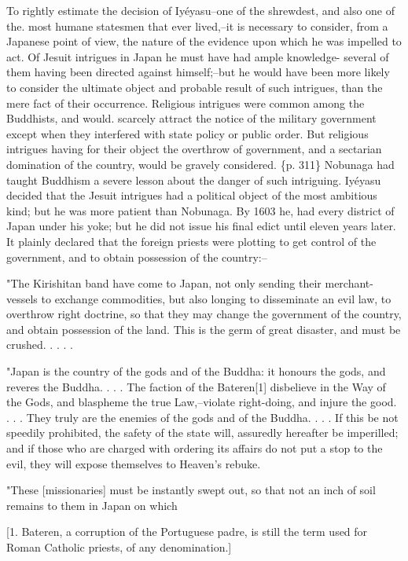 To rightly estimate the decision of Iyéyasu--one of the shrewdest, and also one of the. most humane statesmen that ever lived,--it is necessary to consider, from a Japanese point of view, the nature of the evidence upon which he was impelled to act. Of Jesuit intrigues in Japan he must have had ample knowledge- several of them having been directed against himself;--but he would have been more likely to consider the ultimate object and probable result of such intrigues, than the mere fact of their occurrence. Religious intrigues were common among the Buddhists, and would. scarcely attract the notice of the military government except when they interfered with state policy or public order. But religious intrigues having for their object the overthrow of government, and a sectarian domination of the country, would be gravely considered. \{p. 311\} Nobunaga had taught Buddhism a severe lesson about the danger of such intriguing. Iyéyasu decided that the Jesuit intrigues had a political object of the most ambitious kind; but he was more patient than Nobunaga. By 1603 he, had every district of Japan under his yoke; but he did not issue his final edict until eleven years later. It plainly declared that the foreign priests were plotting to get control of the government, and to obtain possession of the country:--

"The Kirishitan band have come to Japan, not only sending their merchant-vessels to exchange commodities, but also longing to disseminate an evil law, to overthrow right doctrine, so that they may change the government of the country, and obtain possession of the land. This is the germ of great disaster, and must be crushed. . . . .

"Japan is the country of the gods and of the Buddha: it honours the gods, and reveres the Buddha. . . . The faction of the Bateren[1] disbelieve in the Way of the Gods, and blaspheme the true Law,--violate right-doing, and injure the good. . . . They truly are the enemies of the gods and of the Buddha. . . . If this be not speedily prohibited, the safety of the state will, assuredly hereafter be imperilled; and if those who are charged with ordering its affairs do not put a stop to the evil, they will expose themselves to Heaven's rebuke.

"These [missionaries] must be instantly swept out, so that not an inch of soil remains to them in Japan on which

[1. Bateren, a corruption of the Portuguese padre, is still the term used for Roman Catholic priests, of any denomination.]

